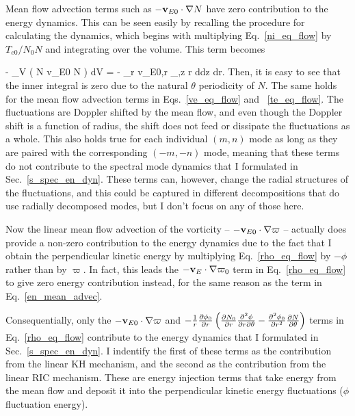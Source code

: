 Mean flow advection terms such as $- {\mathbf v_{E0}} \cdot \nabla N$ have zero contribution to the energy dynamics. This can be seen easily by recalling the procedure for calculating
the dynamics, which begins with multiplying Eq.~\ref{ni_eq_flow} by $T_{e0}/N_0 N$ and integrating over the volume. This term becomes

\beq
\label{en_mean_advec}
- \int_V \left(  N {\mathbf v_{E0}} \cdot \grad N \right) dV = -  \int_r {\mathbf v_{E0,r}}  \int_{\theta,z}  r d\theta dz dr.
\eeq
Then, it is easy to see that the inner integral is zero due to the natural $\theta$ periodicity of $N$. The same holds for the mean flow advection terms in Eqs.~\ref{ve_eq_flow} and
~\ref{te_eq_flow}. The fluctuations are Doppler shifted by the mean flow, and even though the Doppler shift is a function of radius, the shift does not feed or dissipate the fluctuations
as a whole. This also holds true for each individual $(m,n)$ mode as long as they are paired with the corresponding $(-m,-n)$ mode, meaning that these terms do not contribute to
the spectral mode dynamics that I formulated in Sec.~\ref{s_spec_en_dyn}. 
These terms can, however, change the radial structures of the fluctuations, and this could be captured in different decompositions that do use radially decomposed modes,
but I don't focus on any of those here.

Now the linear mean flow advection of the vorticity -- $- {\mathbf v_{E0}} \cdot \nabla \varpi$ -- 
actually does provide a non-zero contribution to the energy dynamics due to the fact that I obtain
the perpendicular kinetic energy by multiplying Eq.~\ref{rho_eq_flow} by $-\phi$ rather than by $\varpi$. In fact, this leads the $- {\mathbf v_{E}} \cdot \nabla \varpi_0$ term in Eq.~\ref{rho_eq_flow}
to give zero energy contribution instead, for the same reason as the term in Eq.~\ref{en_mean_advec}.

Consequentially, only the $- {\mathbf v_{E0}} \cdot \nabla \varpi$ and 
$-\frac{1}{r} \frac{\partial\phi_0}{\partial r} \left(\frac{\partial N_0}{\partial r} \frac{\partial^2\phi}{\partial r \partial\theta} - \frac{\partial^2\phi_0}{\partial r^2} \frac{\partial N}{\partial\theta} \right) \nonumber$ terms in Eq.~\ref{rho_eq_flow} contribute to the energy
dynamics that I formulated in Sec.~\ref{s_spec_en_dyn}. I indentify the first of these terms as the contribution from the linear KH mechanism, and the second as the contribution from the
linear RIC mechanism. These are energy injection terms that take energy from the mean flow and deposit it into the perpendicular kinetic energy fluctuations ($\phi$ fluctuation energy).

